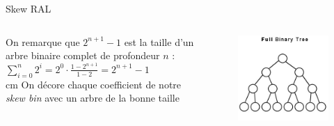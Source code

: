 \documentclass{beamer}
\begin{document}
\begin{frame}[fragile]{Skew RAL}
\begin{columns}

    \begin{column}{0.6\textwidth}

    On remarque que $2^{n+1} - 1$ est la taille d'un arbre binaire complet de profondeur $n$ :\\
    $\sum_{i = 0}^{n} 2^{i} = 2^0 \cdot \frac{1 - 2^{n + 1}}{1 - 2} = 2^{n+1} - 1$\\
     cm
    On décore chaque coefficient de notre \textit{skew bin} avec un arbre de la bonne taille
    \end{column}
    
    \begin{column}{0.3\textwidth}

\begin{figure}
    \centering
   \includegraphics[width=\textwidth]{FullBinary-3822745123.jpg}
\end{figure}
        
\end{column}
\end{columns}

\end{frame}
\end{document}
